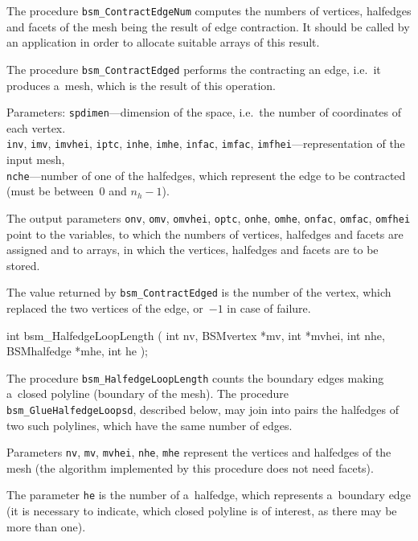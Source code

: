The procedure \texttt{bsm\_ContractEdgeNum} computes the numbers of
vertices, halfedges and facets of the mesh being the result of edge
contraction. It should be called by an application in order to allocate
suitable arrays of this result.

The procedure \texttt{bsm\_ContractEdged} performs the contracting an edge,
i.e.\ it produces a~mesh, which is the result of this operation.

Parameters: \texttt{spdimen}---dimension of the space, i.e.\ the number of
coordinates of each vertex. \\
\texttt{inv}, \texttt{imv}, \texttt{imvhei}, \texttt{iptc}, \texttt{inhe},
\texttt{imhe}, \texttt{infac}, \texttt{imfac},
\texttt{imfhei}---representation of the input mesh, \\
\texttt{nche}---number of one of the halfedges, which represent the edge to
be contracted (must be between~$0$ and $n_h-1$).

The output parameters \texttt{onv}, \texttt{omv}, \texttt{omvhei},
\texttt{optc}, \texttt{onhe}, \texttt{omhe}, \texttt{onfac}, \texttt{omfac},
\texttt{omfhei} point to the variables, to which the numbers of vertices,
halfedges and facets are assigned and to arrays, in which the vertices,
halfedges and facets are to be stored.

The value returned by \texttt{bsm\_ContractEdged} is the number of the
vertex, which replaced the two vertices of the edge, or~$-1$ in case of
failure.

\newpage
\begin{listingC}
int bsm_HalfedgeLoopLength ( int nv, BSMvertex *mv, int *mvhei,
                             int nhe, BSMhalfedge *mhe,
                             int he );
\end{listingC}
The procedure \texttt{bsm\_HalfedgeLoopLength} counts the boundary edges
making a~closed polyline (boundary of the mesh). The procedure
\texttt{bsm\_GlueHalfedgeLoopsd}, described below, may join into pairs the
halfedges of two such polylines, which have the same number of edges.

Parameters \texttt{nv}, \texttt{mv}, \texttt{mvhei}, \texttt{nhe},
\texttt{mhe} represent the vertices and halfedges of the mesh (the algorithm
implemented by this procedure does not need facets).

The parameter \texttt{he} is the number of a~halfedge, which represents
a~boundary edge (it is necessary to indicate, which closed polyline is of
interest, as there may be more than one).


